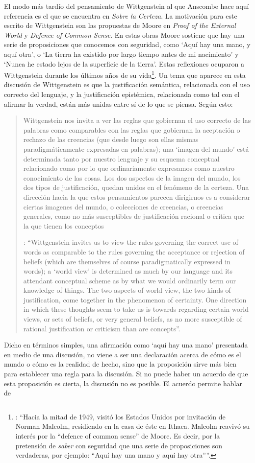 El modo más tardío del pensamiento de Wittgenstein al que Anscombe hace aquí referencia es el que se encuentra en \emph{Sobre la Certeza}. La motivación para este escrito de Wittgenstein son las propuestas de Moore en \emph{Proof of the External World} y \emph{Defence of Common Sense}. En estas obras Moore sostiene que hay una serie de proposiciones que conocemos con seguridad, como \enquote*{Aquí hay una mano, y aquí otra}, o \enquote*{La tierra ha existido por largo tiempo antes de mi nacimiento} y \enquote*{Nunca he estado lejos de la superficie de la tierra}. Estas reflexiones ocuparon a Wittgenstein durante los últimos años de su vida\footnote{\cite[Cf.][vi]{wittgenstein1969oncertes}: \enquote{Hacia la mitad de 1949, visitó los Estados Unidos por invitación de Norman Malcolm, residiendo en la casa de éste en Ithaca. Malcolm reavivó su interés por la ``defence of common sense'' de Moore. Es decir, por la pretensión de \emph{saber} con seguridad que una serie de proposiciones son verdaderas, por ejemplo: ``Aquí hay una mano y aquí hay otra''}.}. Un tema que aparece en esta discusión de Wittgenstein es que la justificación semántica, relacionada con el uso correcto del lenguaje, y la justificación epistémica, relacionada como tal con el afirmar la verdad, están más unidas entre sí de lo que se piensa. Según esto:\blockquote[{\Cite[213]{teichmann2008ans}}: \enquote{Wittgenstein invites us to view the rules governing the correct use of words as comparable to the rules governing the acceptance or rejection of beliefs (which are themselves of course paradigmatically expressed in words); a ‘world view’ is determined as much by our language and its attendant conceptual scheme as by what we would ordinarily term our knowledge of things. The two aspects of world view, the two kinds of justification, come together in the phenomenon of certainty. \textelp{} One direction in which these thoughts seem to take us is towards regarding certain world views, or sets of beliefs, or very general beliefs, as no more susceptible of rational justification or criticism than are concepts}.]{Wittgenstein nos invita a ver las reglas que gobiernan el uso correcto de las palabras como comparables con las reglas que gobiernan la aceptación o rechazo de las creencias (que desde luego son ellas mismas paradigmáticamente expresadas en palabras); una `imagen del mundo' está determinada tanto por nuestro lenguaje y su esquema conceptual relacionado como por lo que ordinariamente expresamos como nuestro conocimiento de las cosas. Los dos aspectos de la imagen del mundo, los dos tipos de justificación, quedan unidos en el fenómeno de la certeza. \textelp{} Una dirección hacia la que estos pensamientos parecen dirigirnos es a considerar ciertas imagenes del mundo, o colecciones de creencias, o creencias generales, como no más susceptibles de justificación racional o crítica que la que tienen los conceptos}. Dicho en términos simples, una afirmación como \enquote*{aquí hay una mano} presentada en medio de una discusión, no viene a ser una declaración acerca de cómo es el mundo o cómo es la realidad de hecho, sino que la proposición sirve más bien para establecer una regla para la discusión. Si no puede haber un acuerdo de que esta proposición es cierta, la discusión no es posible. El acuerdo permite hablar de 